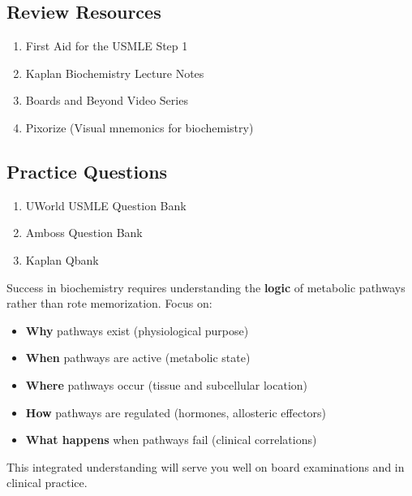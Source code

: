 \subsection{Review Resources}
\begin{enumerate}
    \item First Aid for the USMLE Step 1
    \item Kaplan Biochemistry Lecture Notes
    \item Boards and Beyond Video Series
    \item Pixorize (Visual mnemonics for biochemistry)
\end{enumerate}

\subsection{Practice Questions}
\begin{enumerate}
    \item UWorld USMLE Question Bank
    \item Amboss Question Bank
    \item Kaplan Qbank
\end{enumerate}

\vspace{1cm}

\begin{tcolorbox}[colback=blue!5, colframe=blue!70!black, title=\textbf{Final Note}]
Success in biochemistry requires understanding the \textbf{logic} of metabolic pathways rather than rote memorization. Focus on:
\begin{itemize}
    \item \textbf{Why} pathways exist (physiological purpose)
    \item \textbf{When} pathways are active (metabolic state)
    \item \textbf{Where} pathways occur (tissue and subcellular location)
    \item \textbf{How} pathways are regulated (hormones, allosteric effectors)
    \item \textbf{What happens} when pathways fail (clinical correlations)
\end{itemize}

This integrated understanding will serve you well on board examinations and in clinical practice.
\end{tcolorbox}
